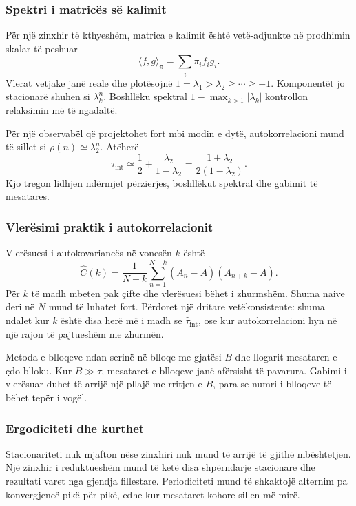 \documentclass[11pt,oneside,openany]{book}
\begin{document}
\subsubsection{Spektri i matricës së kalimit}
Për një zinxhir të kthyeshëm, matrica e kalimit është vetë-adjunkte në prodhimin skalar të peshuar
\begin{equation}
 \langle f,g\rangle_\pi=\sum_i\pi_if_ig_i.
\end{equation}
Vlerat vetjake janë reale dhe plotësojnë $1=\lambda_1>\lambda_2\ge\cdots\ge-1$. Komponentët jo stacionarë shuhen si $\lambda_k^n$. Boshllëku spektral $1-\max_{k>1}|\lambda_k|$ kontrollon relaksimin më të ngadaltë.

Për një observabël që projektohet fort mbi modin e dytë, autokorrelacioni mund të sillet si $\rho(n)\simeq\lambda_2^n$. Atëherë
\begin{equation}
 \tau_{\mathrm{int}}\simeq\frac12+\frac{\lambda_2}{1-\lambda_2}
 =\frac{1+\lambda_2}{2(1-\lambda_2)}.
\end{equation}
Kjo tregon lidhjen ndërmjet përzierjes, boshllëkut spektral dhe gabimit të mesatares.

\subsubsection{Vlerësimi praktik i autokorrelacionit}
Vlerësuesi i autokovariancës në vonesën $k$ është
\begin{equation}
 \widehat C(k)=\frac{1}{N-k}\sum_{n=1}^{N-k}
 (A_n-\overline A)(A_{n+k}-\overline A).
\end{equation}
Për $k$ të madh mbeten pak çifte dhe vlerësuesi bëhet i zhurmshëm. Shuma naive deri në $N$ mund të luhatet fort. Përdoret një dritare vetëkonsistente: shuma ndalet kur $k$ është disa herë më i madh se $\widehat\tau_{\mathrm{int}}$, ose kur autokorrelacioni hyn në një rajon të pajtueshëm me zhurmën.

Metoda e blloqeve ndan serinë në blloqe me gjatësi $B$ dhe llogarit mesataren e çdo blloku. Kur $B\gg\tau$, mesataret e blloqeve janë afërsisht të pavarura. Gabimi i vlerësuar duhet të arrijë një pllajë me rritjen e $B$, para se numri i blloqeve të bëhet tepër i vogël.

\subsubsection{Ergodiciteti dhe kurthet}
Stacionariteti nuk mjafton nëse zinxhiri nuk mund të arrijë të gjithë mbështetjen. Një zinxhir i reduktueshëm mund të ketë disa shpërndarje stacionare dhe rezultati varet nga gjendja fillestare. Periodiciteti mund të shkaktojë alternim pa konvergjencë pikë për pikë, edhe kur mesataret kohore sillen më mirë.
\end{document}

